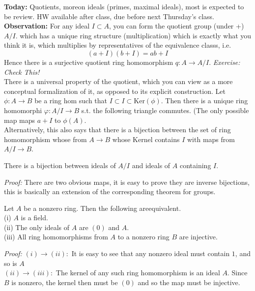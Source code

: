 \documentclass{article}
\begin{document}
\textbf{Today: } Quotients, moreon ideals (primes, maximal ideals), most is expected to be review.
HW available after class, due before next Thursday's class.\\

\textbf{Observation:} For any ideal $I \subset A$, you can form the quotient group (under +) $A/I$.
which has a unique ring structure (multiplication) which is exactly what you think it is, which multiplies by representatives of the equivalence classs, i.e.
\[(a+I)(b+I) = ab+I\]
Hence there is a surjective quotient ring homomorphism $q: A \to A/I$.
\textit{Exercise: Check This!}\\

There is a universal property of the quotient, which you can view as a more conceptual formalization of it, as opposed to its explicit construction.
Let $\phi: A \to B$ be a ring hom such that $I \subset I \subset \text{Ker}(\phi)$. Then there is a unique ring homomorphi $\varphi: A/I \to B$ s.t. the following triangle commutes. (The only possible map maps $a+I$ to $\phi(A)$.\\

Alternatively, this also says that there is a bijection between the set of ring homomorphism whose from $A \to B$ whose Kernel contains $I$ with maps from $A/I \to B$.\\

\begin{clai}{}{}
There is a bijection between ideals of $A/I$ and ideals of $A$ containing $I$.
\end{clai}

\textit{Proof: } There are two obvious maps, it is easy to prove they are inverse bijections, this is basically an extension of the corresponding theorem for groups.\\

\begin{lemm}{}{}
Let $A$ be a nonzero ring. Then the following areequivalent.\\
\indent (i) $A$ is a field.\\
\indent (ii) The only ideals of $A$ are $(0)$ and $A$.\\
\indent (iii) All ring homomorphisms from $A$ to a nonzero ring $B$ are injective.
\end{lemm}
\textit{Proof:} $(i) \to (ii):$ It is easy to see that any nonzero ideal must contain $1$, and so is $A$\\

$(ii) \to (iii):$ The kernel of any such ring homomorphism is an ideal $A$. Since $B$ is nonzero, the kernel then must be $(0)$ and so the map must be injective.\\
\end{document}
